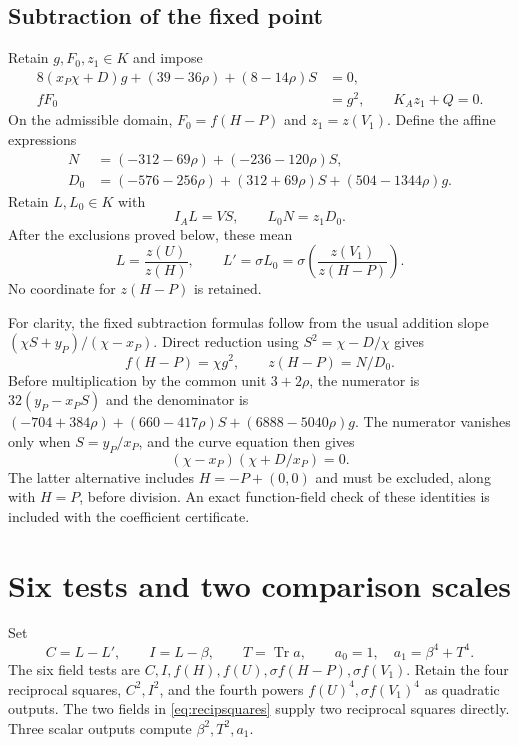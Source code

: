 \documentclass[11pt,a4paper]{article}
\DeclareMathOperator{\Tr}{Tr}\DeclareMathOperator{\Nm}{N}
\begin{document}
\subsection{Subtraction of the fixed point}

Retain $g,F_0,z_1\in K$ and impose
\begin{equation}\label{eq:fixedsubtract}
 \begin{split}
 8(x_P\chi+D)g+(39-36\rho)+(8-14\rho)S&=0,\\
 fF_0&=g^2,\qquad K_Az_1+Q=0.
 \end{split}
\end{equation}
On the admissible domain, $F_0=f(H-P)$ and $z_1=z(V_1)$.
Define the affine expressions
\begin{equation}\label{eq:ND}
 \begin{split}
 N&=(-312-69\rho)+(-236-120\rho)S,\\
 D_0&=(-576-256\rho)+(312+69\rho)S+(504-1344\rho)g.
 \end{split}
\end{equation}
Retain $L,L_0\in K$ with
\begin{equation}\label{eq:ratios}
                         I_AL=VS,\qquad L_0N=z_1D_0.
\end{equation}
After the exclusions proved below, these mean
\[
 L=\frac{z(U)}{z(H)},\qquad
 L'=\sigma L_0=\sigma\!\left(\frac{z(V_1)}{z(H-P)}\right).
\]
No coordinate for $z(H-P)$ is retained.

For clarity, the fixed subtraction formulas follow from the usual
addition slope $(\chi S+y_P)/(\chi-x_P)$.
Direct reduction using $S^2=\chi-D/\chi$ gives
\[
 f(H-P)=\chi g^2,\qquad z(H-P)=N/D_0.
\]
Before multiplication by the common unit $3+2\rho$, the numerator
is $32(y_P-x_PS)$ and the denominator is
$(-704+384\rho)+(660-417\rho)S+(6888-5040\rho)g$.
The numerator vanishes only when
$S=y_P/x_P$, and the curve equation then gives
\[
                    (\chi-x_P)(\chi+D/x_P)=0.
\]
The latter alternative includes $H=-P+(0,0)$ and must be excluded,
along with $H=P$, before division. An exact function-field check of
these identities is included with the coefficient certificate.

\section{Six tests and two comparison scales}

Set
\[
 C=L-L',\qquad I=L-\beta,\qquad T=\Tr a,
 \qquad a_0=1,\quad a_1=\beta^4+T^4.
\]
The six field tests are $C,I,f(H),f(U),\sigma f(H-P),\sigma f(V_1)$.
Retain the four reciprocal squares, $C^2,I^2$, and the fourth powers
$f(U)^4,\sigma f(V_1)^4$ as quadratic outputs. The two fields in
\eqref{eq:recipsquares} supply two reciprocal squares directly.
Three scalar outputs compute $\beta^2,T^2,a_1$.
\end{document}
